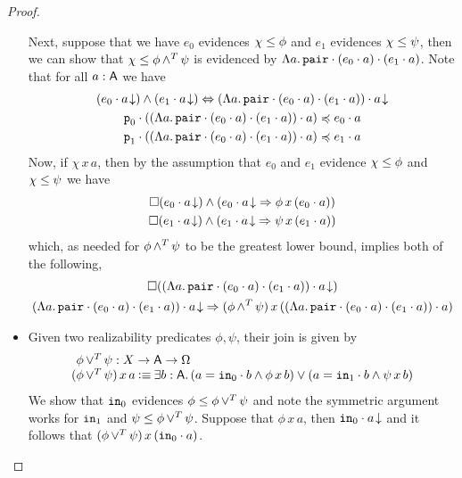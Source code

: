 \documentclass[11pt]{article}
\begin{document}
\begin{proof}
\begin{itemize}
      Next, suppose that we have \(e_{0}\) evidences \({\chi}\leq{\phi}\) and
      \(e_{1}\) evidences \({\chi}\leq{\psi}\), then we can show that
      \({\chi}\leq{{\phi}\mathop{{\land^{T}}}{\psi}}\) is evidenced by
      \(\Lambda{a}.\,{{{\texttt{pair}}\cdot{({e_{0}}\cdot{a})}}\cdot{({e_{1}}\cdot{a})}}\).
      Note that for all \(a:\mathsf{A}\) we have
      \begin{gather*}
        \IIFF%
        {\IAnd{(\ITotal{\IAp{e_{0}}{a}})}{(\ITotal{\IAp{e_{1}}{a}})}}%
        {\ITotal{\IAp{(\IAbs{a}{\IPAp{\IPAp{\IPairCode}{(\IPAp{e_{0}}{a})}}{(\IPAp{e_{1}}{a})}})}{a}}}
        \\
        \IPLeq%
        {\IAp{\IFstCode}{(\IAp{(\IAbs{a}{\IPAp{\IPAp{\IPairCode}{(\IPAp{e_{0}}{a})}}{(\IPAp{e_{1}}{a})}})}{a})}}%
        {\IAp{e_{0}}{a}}
        \\
        \IPLeq%
        {\IAp{\ISndCode}{(\IAp{(\IAbs{a}{\IPAp{\IPAp{\IPairCode}{(\IPAp{e_{0}}{a})}}{(\IPAp{e_{1}}{a})}})}{a})}}%
        {\IAp{e_{1}}{a}}
      \end{gather*}
      Now, if \(\chi\,x\,a\), then by the assumption that \(e_{0}\) and \(e_{1}\)
      evidence \({\chi}\leq{\phi}\) and \({\chi}\leq{\psi}\) we have
      \begin{gather*}
        {\Box{({{{e_{0}}\cdot{a}}\!\downarrow})}}\land{({{{{e_{0}}\cdot{a}}\!\downarrow}}\Rightarrow{\phi\,x\,({e_{0}}\cdot{a})})}
        \\
        {\Box{({{{e_{1}}\cdot{a}}\!\downarrow})}}\land{({{{{e_{1}}\cdot{a}}\!\downarrow}}\Rightarrow{\psi\,x\,({e_{1}}\cdot{a})})}
      \end{gather*}
      which, as needed for \({\phi}\mathop{{\land^{T}}}{\psi}\) to be the greatest lower bound,
      implies both of the following,
      \begin{gather*}
        \IBox{(\ITotal{\IAp{(\IAbs{a}{\IPAp{\IPAp{\IPairCode}{(\IPAp{e_{0}}{a})}}{(\IPAp{e_{1}}{a})}})}{a}})}
        \\
        \IImplies%
        {\ITotal{\IAp{(\IAbs{a}{\IPAp{\IPAp{\IPairCode}{(\IPAp{e_{0}}{a})}}{(\IPAp{e_{1}}{a})}})}{a}}}%
        {(\TAnd{\phi}{\psi})\,x\,(\IAp{(\IAbs{a}{\IPAp{\IPAp{\IPairCode}{(\IPAp{e_{0}}{a})}}{(\IPAp{e_{1}}{a})}})}{a})}
      \end{gather*}

    \item Given two realizability predicates \(\phi,\psi\), their join is given
      by
      \[\begin{array}{l}
          \phantom{(}\TOr{\phi}{\psi} : \IRealPred{X}
          \\
          {(\TOr{\phi}{\psi})\,x\,a}
          \IsDefined
          \IExists{b:\A}{{\IOr%
          {(\IAnd{{a}={\IPAp{\ILeftCode}{b}}}{\phi\,x\,b})}%
          {(\IAnd{{a}={\IPAp{\IRightCode}{b}}}{\psi\,x\,b})}
          }}
        \end{array}\]
      We show that \(\texttt{in}_0\) evidences \({\phi}\leq{{\phi}\mathop{\lor^{T}}{\psi}}\)
      and note the symmetric argument works for \(\texttt{in}_1\)
      and \({\psi}\leq{{\phi}\mathop{\lor^{T}}{\psi}}\).
      Suppose that \(\phi\,x\,a\), then \({{{\texttt{in}_0}\cdot{a}}\!\downarrow}\) and it
      follows that \(({\phi}\mathop{\lor^{T}}{\psi})\,x\,({\texttt{in}_0}\cdot{a})\).


\end{itemize}
\end{proof}
\end{document}
